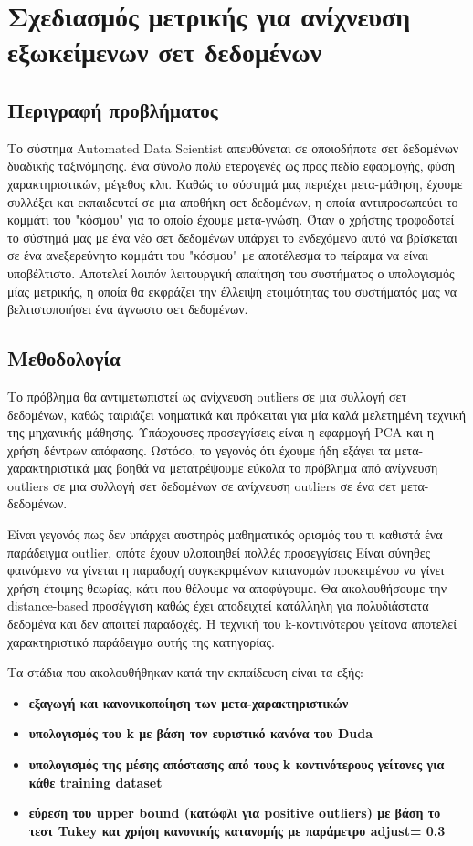 \section{Σχεδιασμός μετρικής για ανίχνευση εξωκείμενων σετ δεδομένων}
\subsection{Περιγραφή προβλήματος}
Το σύστημα Automated Data Scientist απευθύνεται σε οποιοδήποτε σετ δεδομένων δυαδικής ταξινόμησης. ένα σύνολο πολύ ετερογενές ως προς πεδίο εφαρμογής, φύση χαρακτηριστικών, μέγεθος κλπ. Καθώς το σύστημά μας περιέχει μετα-μάθηση, έχουμε συλλέξει και εκπαιδευτεί σε μια αποθήκη σετ δεδομένων, η οποία αντιπροσωπεύει το κομμάτι του "κόσμου" για το οποίο έχουμε μετα-γνώση. Όταν ο χρήστης τροφοδοτεί το σύστημά μας με ένα νέο σετ δεδομένων υπάρχει το ενδεχόμενο αυτό να βρίσκεται σε ένα ανεξερεύνητο κομμάτι του "κόσμου" με αποτέλεσμα το πείραμα να είναι υποβέλτιστο. Αποτελεί λοιπόν λειτουργική απαίτηση του συστήματος ο υπολογισμός μίας μετρικής, η οποία θα εκφράζει την έλλειψη ετοιμότητας του συστήματός μας να βελτιστοποιήσει ένα άγνωστο σετ δεδομένων.

\subsection{Μεθοδολογία}
Το πρόβλημα θα αντιμετωπιστεί ως ανίχνευση outliers σε μια συλλογή  σετ δεδομένων, καθώς ταιριάζει νοηματικά και πρόκειται για μία καλά μελετημένη τεχνική της μηχανικής μάθησης.  Υπάρχουσες προσεγγίσεις είναι η εφαρμογή PCA και η χρήση δέντρων απόφασης. Ωστόσο, το γεγονός ότι έχουμε ήδη εξάγει τα μετα-χαρακτηριστικά μας βοηθά να μετατρέψουμε εύκολα το πρόβλημα από ανίχνευση outliers σε μια συλλογή σετ δεδομένων σε ανίχνευση outliers σε ένα σετ μετα-δεδομένων. 

Είναι γεγονός πως δεν υπάρχει αυστηρός μαθηματικός ορισμός του τι καθιστά ένα παράδειγμα outlier, οπότε έχουν υλοποιηθεί πολλές προσεγγίσεις Είναι σύνηθες φαινόμενο να γίνεται η παραδοχή συγκεκριμένων κατανομών προκειμένου να γίνει χρήση έτοιμης θεωρίας, κάτι που θέλουμε να αποφύγουμε. Θα ακολουθήσουμε την distance-based προσέγγιση καθώς έχει αποδειχτεί κατάλληλη για πολυδιάστατα δεδομένα και δεν απαιτεί παραδοχές.  Η τεχνική του k-κοντινότερου γείτονα αποτελεί χαρακτηριστικό παράδειγμα αυτής της κατηγορίας.

Τα στάδια που ακολουθήθηκαν κατά την εκπαίδευση είναι τα εξής:
\begin{itemize}
	\item \textbf{εξαγωγή και κανονικοποίηση των μετα-χαρακτηριστικών}
	\item \textbf{υπολογισμός του k με βάση τον ευριστικό κανόνα του Duda}
	\item \textbf{υπολογισμός της μέσης απόστασης από τους k κοντινότερους γείτονες για κάθε training dataset}
	\item \textbf{εύρεση του upper bound (κατώφλι για positive outliers) με βάση το τεστ Tukey και χρήση κανονικής κατανομής με παράμετρο adjust= 0.3}
\end{itemize}

